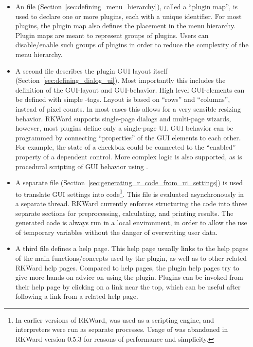 \begin{itemize}
    \item
    An  file (Section~\ref{sec:defining_menu_hierarchy}), 
    called a ``plugin map'', is used to declare one or more plugins, each
    with a unique identifier. For most plugins, the plugin map also defines the
    placement in the menu hierarchy. Plugin maps are meant to represent groups of
    plugins. Users can disable/enable such groups of plugins in order to reduce the
    complexity of the menu hierarchy.

    \item
    A second  file describes the plugin GUI layout itself (Section~\ref{sec:defining_dialog_ui}). 
    Most importantly this includes
    the definition of the GUI-layout and GUI-behavior. High level GUI-elements can
    be defined with simple -tags. Layout is based on ``rows'' and ``columns'',
    instead of pixel counts. In most cases this allows for a very sensible resizing
    behavior. RKWard supports single-page dialogs and multi-page wizards, however,
    most plugins define only a single-page UI. GUI behavior can be programmed by
    connecting ``properties'' of the GUI elements to each other. For example, the state
    of a checkbox could be connected to the ``enabled'' property of a dependent
    control. More complex logic is also supported, as is procedural scripting of GUI
    behavior using .

    \item
    A separate  file (Section~\ref{sec:generating_r_code_from_ui_settings}) 
    is used to translate GUI settings into 
    code\footnote{
        In earlier versions of RKWard,  was used
        as a scripting engine, and  interpreters were run as separate processes.
        Usage of  was abandoned in RKWard version 0.5.3 for reasons of performance and simplicity.
    }. This  file is evaluated asynchronously in a separate thread. RKWard
    currently enforces structuring the code into three separate sections for
    preprocessing, calculating, and printing results. The generated code is always
    run in a local environment, in order to allow the use of temporary variables
    without the danger of overwriting user data.

    \item
    A third  file defines a help page. This help page usually links to the  help
    pages of the main functions/concepts used by the plugin, as well as to other 
    related RKWard help pages. Compared to  help
    pages, the plugin help pages try to give more hands-on advice on using the
    plugin. Plugins can be invoked from their help page by clicking on a link near
    the top, which can be useful after following a link from a related help page.
\end{itemize}

